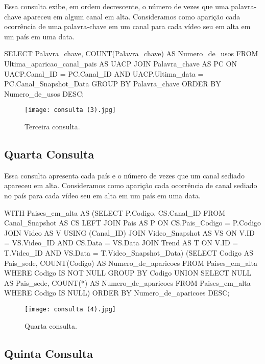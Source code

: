   Essa consulta exibe, em ordem decrescente, o número de vezes que uma palavra-chave apareceu em algum canal em alta. Consideramos como aparição cada ocorrência de uma palavra-chave em um canal para cada vídeo seu em alta em um país em uma data.

  \begin{code}
SELECT Palavra_chave, COUNT(Palavra_chave) AS Numero_de_usos
FROM Ultima_aparicao_canal_pais AS UACP JOIN
    Palavra_chave AS PC ON UACP.Canal_ID = PC.Canal_ID AND
                  UACP.Ultima_data = PC.Canal_Snapshot_Data
GROUP BY Palavra_chave
ORDER BY Numero_de_usos DESC;
  \end{code}

  \begin{figure}[H]
    \centering
    \texttt{[image: consulta (3).jpg]}
    \caption{Terceira consulta.}
  \end{figure}

\subsection{Quarta Consulta}

  Essa consulta apresenta cada país e o número de vezes que um canal sediado apareceu em alta. Consideramos como aparição cada ocorrência de canal sediado no país para cada vídeo seu em alta em um país em uma data.

  \begin{code}
WITH
  Paises_em_alta AS
    (SELECT P.Codigo, CS.Canal_ID
         FROM Canal_Snapshot AS CS LEFT JOIN
        Pais AS P ON CS.Pais_Codigo = P.Codigo JOIN
          Video AS V USING (Canal_ID) JOIN
            Video_Snapshot AS VS ON V.ID = VS.Video_ID AND
                        CS.Data = VS.Data JOIN
              Trend AS T ON V.ID = T.Video_ID AND
                      VS.Data = T.Video_Snapshot_Data)
(SELECT Codigo AS Pais_sede, COUNT(Codigo) AS Numero_de_aparicoes
 FROM Paises_em_alta
 WHERE Codigo IS NOT NULL
 GROUP BY Codigo
 UNION
 SELECT NULL AS Pais_sede, COUNT(*) AS Numero_de_aparicoes
 FROM Paises_em_alta
 WHERE Codigo IS NULL)
ORDER BY Numero_de_aparicoes DESC;
  \end{code}

  \begin{figure}[H]
    \centering
    \texttt{[image: consulta (4).jpg]}
    \caption{Quarta consulta.}
  \end{figure}

\subsection{Quinta Consulta}

